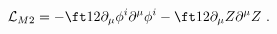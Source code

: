 \begin{equation}
\mathcal{L}_{M2}= -\ft12 \partial_\mu \phi^i \partial^\mu \phi^i -\ft12 
\partial_\mu Z \partial^\mu Z\ .
\label{M2mink}
\end{equation}

